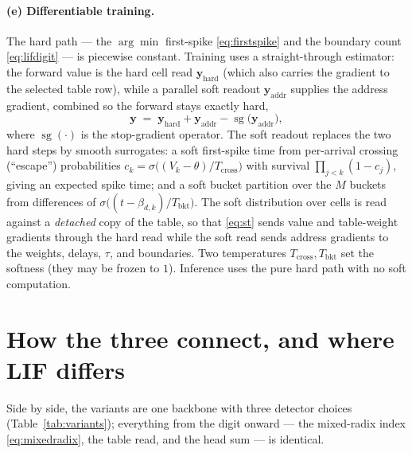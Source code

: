 \documentclass[11pt]{article}
\DeclareMathOperator{\sg}{sg}          %
\begin{document}
\paragraph{(e) Differentiable training.} The hard path --- the $\arg\min$ first-spike \eqref{eq:firstspike} and
the boundary count \eqref{eq:lifdigit} --- is piecewise constant. Training uses a straight-through estimator:
the forward value is the hard cell read $\mathbf{y}_{\mathrm{hard}}$ (which also carries the gradient to the
selected table row), while a parallel soft readout $\mathbf{y}_{\mathrm{addr}}$ supplies the address gradient,
combined so the forward stays exactly hard,
\begin{equation}
  \mathbf{y} \;=\; \mathbf{y}_{\mathrm{hard}} + \mathbf{y}_{\mathrm{addr}} - \sg\!\big(\mathbf{y}_{\mathrm{addr}}\big),
  \label{eq:st}
\end{equation}
where $\sg(\cdot)$ is the stop-gradient operator. The soft readout replaces the two hard steps by smooth
surrogates: a soft first-spike time from per-arrival crossing (``escape'') probabilities
$c_k = \sigma\!\big((V_k - \theta)/T_{\mathrm{cross}}\big)$ with survival $\prod_{j<k}(1 - c_j)$, giving an
expected spike time; and a soft bucket partition over the $M$ buckets from differences of
$\sigma\!\big((t - \beta_{d,k})/T_{\mathrm{bkt}}\big)$. The soft distribution over cells is read against a
\emph{detached} copy of the table, so that \eqref{eq:st} sends value and table-weight gradients through the
hard read while the soft read sends address gradients to the weights, delays, $\tau$, and boundaries. Two
temperatures $T_{\mathrm{cross}}, T_{\mathrm{bkt}}$ set the softness (they may be frozen to $1$). Inference
uses the pure hard path with no soft computation.

\section{How the three connect, and where LIF differs}
\label{sec:connect}

Side by side, the variants are one backbone with three detector choices (Table~\ref{tab:variants}); everything
from the digit onward --- the mixed-radix index \eqref{eq:mixedradix}, the table read, and the head sum --- is
identical.
\end{document}
